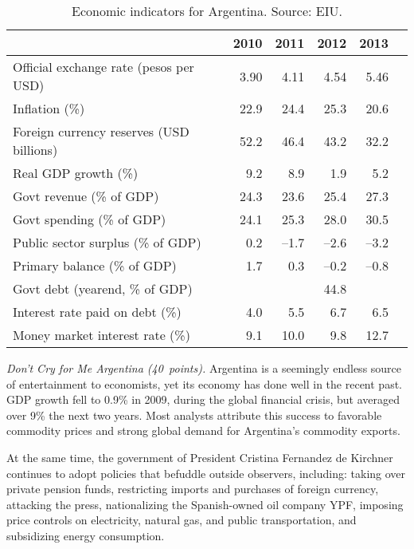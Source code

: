 \documentclass[letterpaper,12pt]{exam}
\begin{document}
\begin{questions}
\begin{table}[h]
\centering
\tabcolsep=0.1in
\begin{tabular}{lrrrrr}
\toprule
                & 2010 & 2011 & 2012 & 2013 \\
\midrule
Official exchange rate (pesos per USD)  & 3.90 & 4.11 & 4.54 & 5.46  \\
Inflation (\%)              & 22.9 & 24.4 & 25.3 & 20.6 \\
Foreign currency reserves (USD billions) & 52.2 & 46.4 & 43.2 & 32.2 \\
Real GDP growth (\%)        & 9.2 & 8.9 & 1.9 & 5.2  \\
Govt revenue (\% of GDP)    & 24.3 & 23.6 & 25.4 & 27.3 \\
Govt spending (\% of GDP)   & 24.1 & 25.3 & 28.0 & 30.5  \\
Public sector surplus (\% of GDP) & 0.2 & --1.7 & --2.6 & --3.2 \\
Primary balance (\% of GDP) &  1.7 & 0.3 & --0.2 & --0.8   \\
Govt debt (yearend, \% of GDP)  & & & 44.8\\
Interest rate paid on debt (\%) & 4.0 & 5.5 & 6.7 & 6.5  \\
Money market interest rate (\%) & 9.1 & 10.0 & 9.8 & 12.7 \\
\bottomrule
\end{tabular}
\label{tab:portugal}
\caption{Economic indicators for Argentina.  Source:  EIU.}
\end{table}

\item  {\it Don't Cry for Me Argentina (40~points).\/}
Argentina is a seemingly endless source of entertainment to economists,
yet its economy has done well in the recent past.
GDP growth fell to 0.9\% in 2009, during the global financial crisis,
but averaged over 9\% the next two years.
Most analysts attribute this success to
favorable commodity prices and strong global demand for Argentina's commodity exports.

At the same time, the government of President Cristina Fernandez de Kirchner
continues to adopt policies that befuddle outside observers, including:
taking over private pension funds,
restricting imports and purchases of foreign currency,
attacking the press,
nationalizing the Spanish-owned oil company YPF,
imposing price controls on electricity, natural gas, and public transportation,
and subsidizing energy consumption.


\end{questions}
\end{document}
